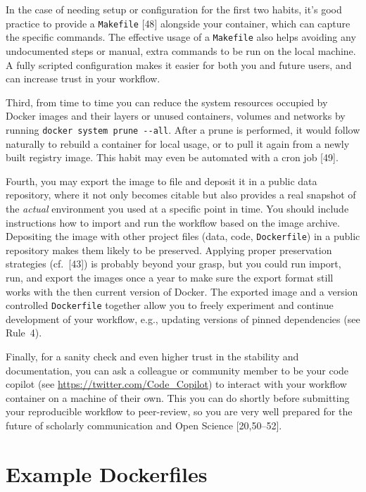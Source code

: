 \documentclass[10pt,letterpaper]{article}
\begin{document}
In the case of needing setup or configuration for the first two habits,
it's good practice to provide a \texttt{Makefile} {[}48{]} alongside
your container, which can capture the specific commands. The effective
usage of a \texttt{Makefile} also helps avoiding any undocumented steps
or manual, extra commands to be run on the local machine. A fully
scripted configuration makes it easier for both you and future users,
and can increase trust in your workflow.

Third, from time to time you can reduce the system resources occupied by
Docker images and their layers or unused containers, volumes and
networks by running \texttt{docker\ system\ prune\ -\/-all}. After a
prune is performed, it would follow naturally to rebuild a container for
local usage, or to pull it again from a newly built registry image. This
habit may even be automated with a cron job {[}49{]}.

Fourth, you may export the image to file and deposit it in a public data
repository, where it not only becomes citable but also provides a real
snapshot of the \emph{actual} environment you used at a specific point
in time. You should include instructions how to import and run the
workflow based on the image archive. Depositing the image with other
project files (data, code, \texttt{Dockerfile}) in a public repository
makes them likely to be preserved. Applying proper preservation
strategies (cf.~{[}43{]}) is probably beyond your grasp, but you could
run import, run, and export the images once a year to make sure the
export format still works with the then current version of Docker. The
exported image and a version controlled \texttt{Dockerfile} together
allow you to freely experiment and continue development of your
workflow, e.g., updating versions of pinned dependencies (see Rule~4).

Finally, for a sanity check and even higher trust in the stability and
documentation, you can ask a colleague or community member to be your
code copilot (see \url{https://twitter.com/Code_Copilot}) to interact
with your workflow container on a machine of their own. This you can do
shortly before submitting your reproducible workflow to peer-review, so
you are very well prepared for the future of scholarly communication and
Open Science {[}20,50--52{]}.

\hypertarget{example-dockerfiles}{%
\section{Example Dockerfiles}\label{example-dockerfiles}}
\end{document}
